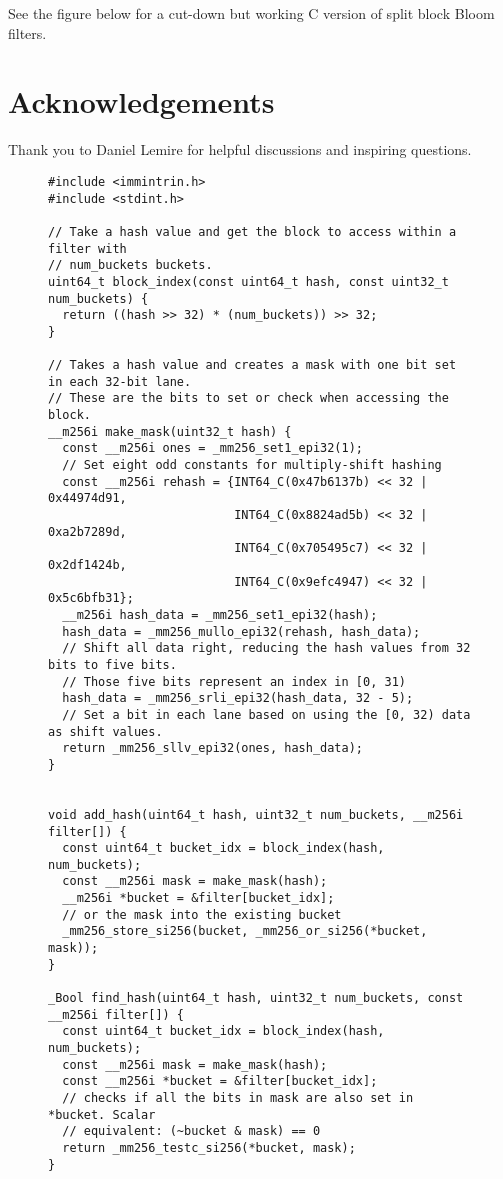 \documentclass[letterpaper, 11pt]{article}
\begin{document}
See the figure below for a cut-down but working C version of split block Bloom filters.

\section*{Acknowledgements}
Thank you to Daniel Lemire for helpful discussions and inspiring questions.




\appendix{}
\begin{figure}
  \begin{framed}
\begin{verbatim}
#include <immintrin.h>
#include <stdint.h>

// Take a hash value and get the block to access within a filter with
// num_buckets buckets.
uint64_t block_index(const uint64_t hash, const uint32_t num_buckets) {
  return ((hash >> 32) * (num_buckets)) >> 32;
}

// Takes a hash value and creates a mask with one bit set in each 32-bit lane.
// These are the bits to set or check when accessing the block.
__m256i make_mask(uint32_t hash) {
  const __m256i ones = _mm256_set1_epi32(1);
  // Set eight odd constants for multiply-shift hashing
  const __m256i rehash = {INT64_C(0x47b6137b) << 32 | 0x44974d91,
                          INT64_C(0x8824ad5b) << 32 | 0xa2b7289d,
                          INT64_C(0x705495c7) << 32 | 0x2df1424b,
                          INT64_C(0x9efc4947) << 32 | 0x5c6bfb31};
  __m256i hash_data = _mm256_set1_epi32(hash);
  hash_data = _mm256_mullo_epi32(rehash, hash_data);
  // Shift all data right, reducing the hash values from 32 bits to five bits.
  // Those five bits represent an index in [0, 31)
  hash_data = _mm256_srli_epi32(hash_data, 32 - 5);
  // Set a bit in each lane based on using the [0, 32) data as shift values.
  return _mm256_sllv_epi32(ones, hash_data);
}


void add_hash(uint64_t hash, uint32_t num_buckets, __m256i filter[]) {
  const uint64_t bucket_idx = block_index(hash, num_buckets);
  const __m256i mask = make_mask(hash);
  __m256i *bucket = &filter[bucket_idx];
  // or the mask into the existing bucket
  _mm256_store_si256(bucket, _mm256_or_si256(*bucket, mask));
}

_Bool find_hash(uint64_t hash, uint32_t num_buckets, const __m256i filter[]) {
  const uint64_t bucket_idx = block_index(hash, num_buckets);
  const __m256i mask = make_mask(hash);
  const __m256i *bucket = &filter[bucket_idx];
  // checks if all the bits in mask are also set in *bucket. Scalar
  // equivalent: (~bucket & mask) == 0
  return _mm256_testc_si256(*bucket, mask);
}
\end{verbatim}
  \end{framed}
\end{figure}
\end{document}
